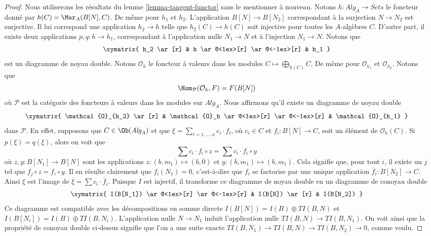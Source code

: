 \begin{proof}
Nous utiliserons les résultats du
lemme \ref{lemma-tangent-functor}
sans le mentionner à nouveau.
Notons $h : \textit{Alg}_A \to \textit{Sets}$ le foncteur donné par
$h(C) = \Mor_A(B[N], C)$. De même pour $h_1$ et $h_2$.
L'application $B[N] \to B[N_2]$ correspondant à la surjection $N \to N_2$
est surjective. Il lui correspond une application $h_2 \to h$ telle que
$h_2(C) \to h(C)$ soit injective pour toutes les $A$-algèbres $C$. D'autre
part, il existe deux applications $p, q : h \to h_1$, correspondant à
l'application nulle $N_1 \to N$ et à l'injection $N_1 \to N$. Notons que
$$
\xymatrix{
h_2 \ar[r] & h \ar@<1ex>[r] \ar@<-1ex>[r] & h_1
}
$$
est un diagramme de noyau double. Notons $\mathcal{O}_h$ le foncteur à valeurs dans les modules
$C \mapsto \bigoplus_{h(C)} C$. De même pour $\mathcal{O}_{h_1}$ et
$\mathcal{O}_{h_2}$. Notons que
$$
\Hom_\mathcal{P}(\mathcal{O}_h, F) = F(B[N])
$$
où $\mathcal{P}$ est la catégorie des foncteurs à valeurs dans les modules sur
$\textit{Alg}_A$. Nous affirmons qu'il existe un diagramme de noyau double
$$
\xymatrix{
\mathcal{O}_{h_2} \ar[r] &
\mathcal{O}_h \ar@<1ex>[r] \ar@<-1ex>[r] &
\mathcal{O}_{h_1}
}
$$
dans $\mathcal{P}$. En effet, supposons que $C \in \Ob(\textit{Alg}_A)$
et que $\xi = \sum_{i = 1, \ldots, n} c_i \cdot f_i$, où $c_i \in C$ et
$f_i : B[N] \to C$, soit un élément de
$\mathcal{O}_h(C)$. Si $p(\xi) = q(\xi)$, alors
on voit que
$$
\sum c_i \cdot f_i \circ z = \sum c_i \cdot f_i \circ y
$$
où $z, y : B[N_1] \to B[N]$ sont les applications $z : (b, m_1) \mapsto (b, 0)$
et $y : (b, m_1) \mapsto (b, m_1)$. Cela signifie que, pour tout $i$,
il existe un $j$ tel que $f_j \circ z = f_i \circ y$. Il en résulte clairement
que $f_i(N_1) = 0$, c'est-à-dire que $f_i$ se factorise par une unique application
$\overline{f}_i : B[N_2] \to C$. Ainsi $\xi$ est l'image de
$\overline{\xi} = \sum c_i \cdot \overline{f}_i$.
Puisque $I$ est injectif, il transforme ce diagramme de noyau double
en un diagramme de conoyau double
$$
\xymatrix{
I(B[N_1]) \ar@<1ex>[r] \ar@<-1ex>[r] &
I(B[N]) \ar[r] &
I(B[N_2])
}
$$
Ce diagramme est compatible avec les décompositions en somme directe
$I(B[N]) = I(B) \oplus TI(B, N)$ et $I(B[N_i]) = I(B) \oplus TI(B, N_i)$.
L'application nulle $N \to N_1$ induit l'application nulle $TI(B, N) \to TI(B, N_1)$.
On voit ainsi que la propriété de conoyau double
ci-dessus signifie que l'on a une suite exacte
$TI(B, N_1) \to TI(B, N) \to TI(B, N_2) \to 0$,
comme voulu.
\end{proof}

